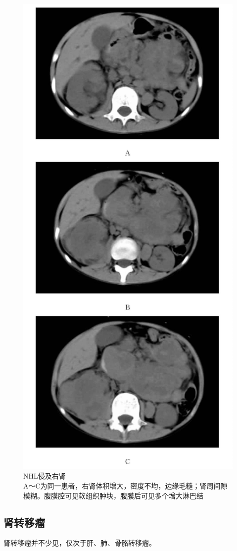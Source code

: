 \begin{figure}[!htbp]
 \centering
 \includegraphics[width=.7\textwidth,height=\textheight,keepaspectratio]{./images/Image00341.jpg}
 \captionsetup{justification=centering}
 \caption{NHL侵及右肾\\{\small A～C为同一患者，右肾体积增大，密度不均，边缘毛糙；肾周间隙模糊。腹膜腔可见软组织肿块，腹膜后可见多个增大淋巴结}}
 \label{fig15-24}
  \end{figure} 

\subsection{肾转移瘤}

肾转移瘤并不少见，仅次于肝、肺、骨骼转移瘤。

